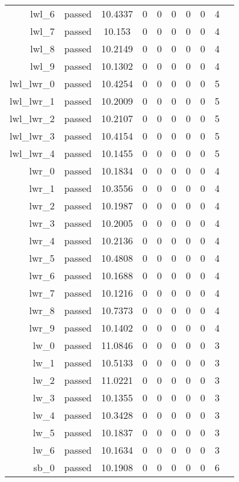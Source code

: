 \begin{longtable}{r|ccccccccc}
    lwl\_6 & passed & 10.4337 & 0 & 0 & 0 & 0 & 0 & 4 \\
    lwl\_7 & passed & 10.153 & 0 & 0 & 0 & 0 & 0 & 4 \\
    lwl\_8 & passed & 10.2149 & 0 & 0 & 0 & 0 & 0 & 4 \\
    lwl\_9 & passed & 10.1302 & 0 & 0 & 0 & 0 & 0 & 4 \\
    lwl\_lwr\_0 & passed & 10.4254 & 0 & 0 & 0 & 0 & 0 & 5 \\
    lwl\_lwr\_1 & passed & 10.2009 & 0 & 0 & 0 & 0 & 0 & 5 \\
    lwl\_lwr\_2 & passed & 10.2107 & 0 & 0 & 0 & 0 & 0 & 5 \\
    lwl\_lwr\_3 & passed & 10.4154 & 0 & 0 & 0 & 0 & 0 & 5 \\
    lwl\_lwr\_4 & passed & 10.1455 & 0 & 0 & 0 & 0 & 0 & 5 \\
    lwr\_0 & passed & 10.1834 & 0 & 0 & 0 & 0 & 0 & 4 \\
    lwr\_1 & passed & 10.3556 & 0 & 0 & 0 & 0 & 0 & 4 \\
    lwr\_2 & passed & 10.1987 & 0 & 0 & 0 & 0 & 0 & 4 \\
    lwr\_3 & passed & 10.2005 & 0 & 0 & 0 & 0 & 0 & 4 \\
    lwr\_4 & passed & 10.2136 & 0 & 0 & 0 & 0 & 0 & 4 \\
    lwr\_5 & passed & 10.4808 & 0 & 0 & 0 & 0 & 0 & 4 \\
    lwr\_6 & passed & 10.1688 & 0 & 0 & 0 & 0 & 0 & 4 \\
    lwr\_7 & passed & 10.1216 & 0 & 0 & 0 & 0 & 0 & 4 \\
    lwr\_8 & passed & 10.7373 & 0 & 0 & 0 & 0 & 0 & 4 \\
    lwr\_9 & passed & 10.1402 & 0 & 0 & 0 & 0 & 0 & 4 \\
    lw\_0 & passed & 11.0846 & 0 & 0 & 0 & 0 & 0 & 3 \\
    lw\_1 & passed & 10.5133 & 0 & 0 & 0 & 0 & 0 & 3 \\
    lw\_2 & passed & 11.0221 & 0 & 0 & 0 & 0 & 0 & 3 \\
    lw\_3 & passed & 10.1355 & 0 & 0 & 0 & 0 & 0 & 3 \\
    lw\_4 & passed & 10.3428 & 0 & 0 & 0 & 0 & 0 & 3 \\
    lw\_5 & passed & 10.1837 & 0 & 0 & 0 & 0 & 0 & 3 \\
    lw\_6 & passed & 10.1634 & 0 & 0 & 0 & 0 & 0 & 3 \\
    sb\_0 & passed & 10.1908 & 0 & 0 & 0 & 0 & 0 & 6 \\

\end{longtable}
